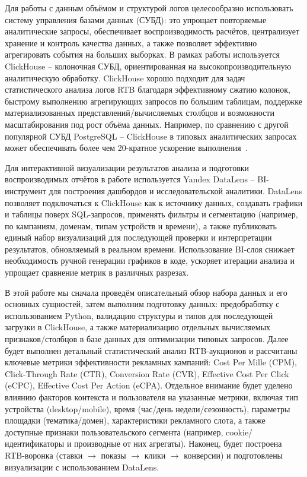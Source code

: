 Для работы с данным объёмом и структурой логов целесообразно использовать систему управления базами данных (СУБД): это упрощает повторяемые аналитические запросы, обеспечивает воспроизводимость расчётов, централизует хранение и контроль качества данных, а также позволяет эффективно агрегировать события на больших выборках. В рамках работы используется ClickHouse -- колоночная СУБД, ориентированная на высокопроизводительную аналитическую обработку. ClickHouse хорошо подходит для задач статистического анализа логов RTB благодаря эффективному сжатию колонок, быстрому выполнению агрегирующих запросов по большим таблицам, поддержке материализованных представлений/вычисляемых столбцов и возможности масштабирования под рост объёма данных. Например, по сравнению с другой популярной СУБД PostgreSQL -- ClickHouse в типовых аналитических запросах может обеспечивать более чем 20-кратное ускорение выполнения~\cite{clickhouse-vs-postgres}.

Для интерактивной визуализации результатов анализа и подготовки воспроизводимых отчётов в работе используется Yandex DataLens -- BI-инструмент для построения дашбордов и исследовательской аналитики. DataLens позволяет подключаться к ClickHouse как к источнику данных, создавать графики и таблицы поверх SQL-запросов, применять фильтры и сегментацию (например, по кампаниям, доменам, типам устройств и времени), а также публиковать единый набор визуализаций для последующей проверки и интерпретации результатов, обновляемый в реальном времени. Использование BI-слоя снижает необходимость ручной генерации графиков в коде, ускоряет итерации анализа и упрощает сравнение метрик в различных разрезах.

В этой работе мы сначала проведём описательный обзор набора данных и его основных сущностей, затем выполним подготовку данных: предобработку с использованием Python, валидацию структуры и типов для последующей загрузки в ClickHouse, а также материализацию отдельных вычисляемых признаков/столбцов в базе данных для оптимизации типовых запросов. Далее будет выполнен детальный статистический анализ RTB-аукционов и рассчитаны ключевые метрики эффективности рекламных кампаний: Cost Per Mille (CPM), Click-Through Rate (CTR), Conversion Rate (CVR), Effective Cost Per Click (eCPC), Effective Cost Per Action (eCPA). Отдельное внимание будет уделено влиянию факторов контекста и пользователя на указанные метрики, включая тип устройства (desktop/mobile), время (час/день недели/сезонность), параметры площадки (тематика/домен), характеристики рекламного слота, а также доступные признаки пользовательского сегмента (например, cookie/идентификаторы и производные от них агрегаты). Наконец, будет построена RTB-воронка (ставки \(\rightarrow\) показы \(\rightarrow\) клики \(\rightarrow\) конверсии) и подготовлены визуализации с использованием DataLens.

